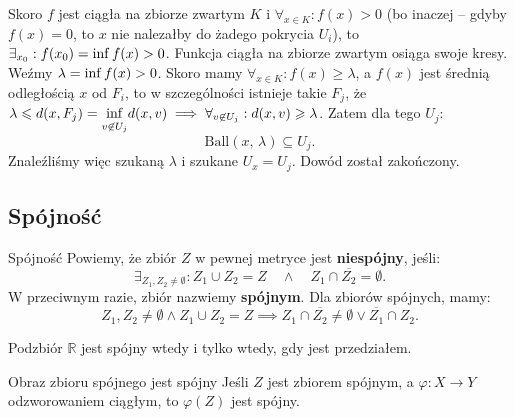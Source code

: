 \documentclass{article}
\numberwithin{defi}{section}
\numberwithin{defi}{section}
\newcommand{\R}{\mathbb{R}}
\newcommand{\se}{\subseteq}
\renewcommand{\inf}{\mathop{\mathrm{inf}\vphantom{\mathrm{sup}}}}
\providecommand{\ol}{\overline}
\renewcommand{\geq}{\geqslant}
\renewcommand{\leq}{\leqslant}
\newcommand{\ball}[2]{\text{Ball}(#1, \, #2)}
\begin{document}
\begin{dow}
\begin{itemize}
        Skoro $f$ jest ciągła na zbiorze zwartym $K$ i $\forall_{x \in K}: f(x) > 0$ (bo inaczej -- gdyby $f(x) = 0$, to $x$ nie nalezałby do żadego pokrycia $U_i$), to $\exists_{x_0}: f(x_0) = \inf f(x) >0$. Funkcja ciągła na zbiorze zwartym osiąga swoje kresy. Weźmy $\lambda = \inf f(x) > 0$. Skoro mamy $\forall_{x \in K}: f(x) \geq \lambda$, a $f(x)$ jest średnią odległością $x$ od $F_i$, to w szczególności istnieje takie $F_j$, że $\lambda \leq d(x, F_j) = \mathlarger{\inf}_{v \not \in U_j}d(x, v)  \implies \forall_{v \not \in U_j}: d(x, v) \geq \lambda$.  Zatem dla tego $U_j$:\begin{equation*}
            \ball{x}{\lambda} \se U_j.
        \end{equation*} Znaleźliśmy więc szukaną $\lambda$ i szukane $U_x = U_j$. Dowód został zakończony.
    \end{itemize}
\end{dow}


\subsection{Spójność}

\begin{defr}{Spójność}
    Powiemy, że zbiór $Z$ w pewnej metryce jest \textbf{niespójny}, jeśli:\begin{equation}
        \exists_{Z_1, Z_2 \neq \emptyset}: Z_1 \cup Z_2 = Z \quad \wedge \quad  Z_1 \cap \ol{Z_2} = \emptyset.
    \end{equation} W przeciwnym razie, zbiór nazwiemy \textbf{spójnym}. Dla zbiorów spójnych, mamy: \begin{equation*}
        Z_1, Z_2 \neq \emptyset \wedge Z_1 \cup Z_2 = Z \implies Z_1 \cap \ol{Z_2} \neq \emptyset \vee \ol{Z_1} \cap Z_2.
    \end{equation*}
\end{defr}

\begin{obs}{}
    Podzbiór $\R$ jest spójny wtedy i tylko wtedy, gdy jest przedziałem.
\end{obs}



\begin{twier}{Obraz zbioru spójnego jest spójny}
    Jeśli $Z$ jest zbiorem spójnym, a $\varphi: X \to Y$ odzworowaniem ciągłym, to $\varphi(Z)$ jest spójny.
\end{twier}
\end{document}
